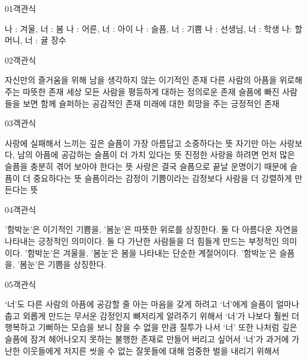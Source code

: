 \documentclass[fs9,seriesFre]{korfarm-base}
\begin{document}
\par\medskip
\kfBeginMC
\begin{kfQBlock}{01}{객관식}
\begin{kfChoices}
\kfChoice 나 : 겨울, 너 : 봄
\kfChoice 나 : 어른, 너 : 아이
\kfChoice 나 : 슬픔, 너 : 기쁨
\kfChoice 나 : 선생님, 너 : 학생
\kfChoice 나: 할머니, 너 : 귤 장수
\end{kfChoices}
\end{kfQBlock}
\begin{kfQBlock}{02}{객관식}
\begin{kfChoices}
\kfChoice 자신만의 즐거움을 위해 남을 생각하지 않는 이기적인 존재
\kfChoice 다른 사람의 아픔을 위로해주는 따뜻한 존재
\kfChoice 세상 모든 사람을 평등하게 대하는 정의로운 존재
\kfChoice 슬픔에 빠진 사람들을 보면 함께 슬퍼하는 공감적인 존재
\kfChoice 미래에 대한 희망을 주는 긍정적인 존재
\end{kfChoices}
\end{kfQBlock}
\begin{kfQBlock}{03}{객관식}
\begin{kfChoices}
\kfChoice 사랑에 실패해서 느끼는 깊은 슬픔이 가장 아름답고 소중하다는 뜻
\kfChoice 자기만 아는 사랑보다, 남의 아픔에 공감하는 슬픔이 더 가치 있다는 뜻
\kfChoice 진정한 사랑을 하려면 먼저 많은 슬픔을 충분히 겪어 보아야 한다는 뜻
\kfChoice 사랑은 결국 슬픔으로 끝날 운명이기 때문에 슬픔이 더 중요하다는 뜻
\kfChoice 슬픔이라는 감정이 기쁨이라는 감정보다 사람을 더 강렬하게 만든다는 뜻
\end{kfChoices}
\end{kfQBlock}
\begin{kfQBlock}{04}{객관식}
\begin{kfChoices}
\kfChoice '함박눈'은 이기적인 기쁨을, '봄눈'은 따뜻한 위로를 상징한다.
\kfChoice 둘 다 아름다운 자연을 나타내는 긍정적인 의미이다.
\kfChoice 둘 다 가난한 사람들을 더 힘들게 만드는 부정적인 의미이다.
\kfChoice '함박눈'은 겨울을, '봄눈'은 봄을 나타내는 단순한 계절어이다.
\kfChoice '함박눈'은 슬픔을, '봄눈'은 기쁨을 상징한다.
\end{kfChoices}
\end{kfQBlock}
\begin{kfQBlock}{05}{객관식}
\begin{kfChoices}
\kfChoice ‘너’도 다른 사람의 아픔에 공감할 줄 아는 마음을 갖게 하려고
\kfChoice ‘너’에게 슬픔이 얼마나 춥고 외롭게 만드는 무서운 감정인지 뼈저리게 알려주기 위해서
\kfChoice ‘너’가 나보다 훨씬 더 행복하고 기뻐하는 모습을 보니 참을 수 없을 만큼 질투가 나서
\kfChoice ‘너’ 또한 나처럼 깊은 슬픔에 잠겨 헤어나오지 못하는 불행한 존재로 만들어 버리고 싶어서
\kfChoice ‘너’가 과거에 가난한 이웃들에게 저지른 씻을 수 없는 잘못들에 대해 엄중한 벌을 내리기 위해서
\end{kfChoices}
\end{kfQBlock}
\end{document}
